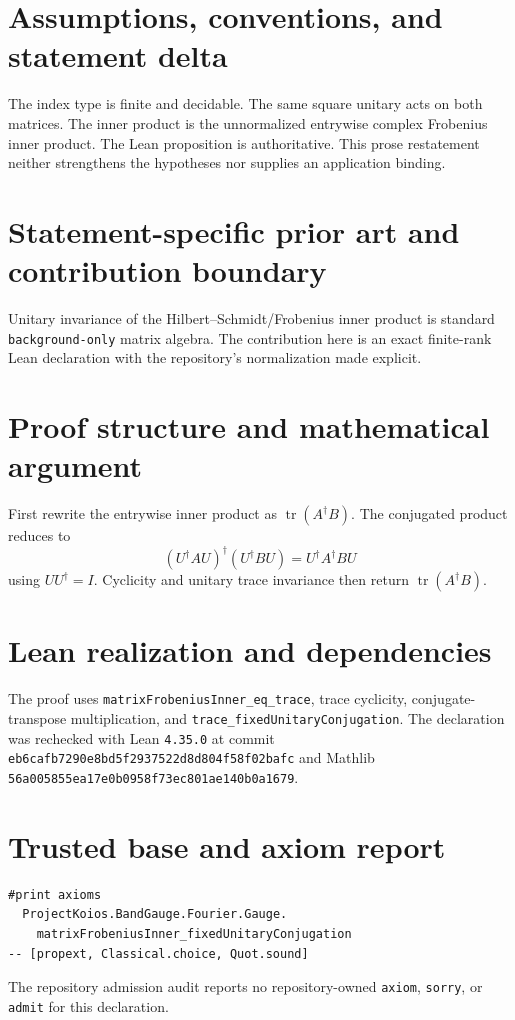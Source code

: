 \documentclass[11pt]{article}
\begin{document}
\section{Assumptions, conventions, and statement delta}
The index type is finite and decidable.  The same square unitary acts on both matrices.  The inner product is the unnormalized entrywise complex Frobenius inner product.
The Lean proposition is authoritative.  This prose restatement neither strengthens the hypotheses
nor supplies an application binding.

\section{Statement-specific prior art and contribution boundary}
Unitary invariance of the Hilbert--Schmidt/Frobenius inner product is standard \texttt{background-only} matrix algebra.  The contribution here is an exact finite-rank Lean declaration with the repository's normalization made explicit.

\section{Proof structure and mathematical argument}
First rewrite the entrywise inner product as $\operatorname{tr}(A^{\dagger}B)$.  The conjugated product reduces to
\[
 (U^{\dagger}AU)^{\dagger}(U^{\dagger}BU)=U^{\dagger}A^{\dagger}BU
\]
using $UU^{\dagger}=I$.  Cyclicity and unitary trace invariance then return $\operatorname{tr}(A^{\dagger}B)$.

\section{Lean realization and dependencies}
The proof uses \texttt{matrixFrobeniusInner\_eq\_trace}, trace cyclicity, conjugate-transpose multiplication, and \texttt{trace\_fixedUnitaryConjugation}.  The declaration was rechecked with Lean \texttt{4.35.0} at commit \texttt{eb6cafb7290e8bd5f2937522d8d804f58f02bafc} and Mathlib \texttt{56a005855ea17e0b0958f73ec801ae140b0a1679}.

\section{Trusted base and axiom report}
\begin{verbatim}
#print axioms
  ProjectKoios.BandGauge.Fourier.Gauge.
    matrixFrobeniusInner_fixedUnitaryConjugation
-- [propext, Classical.choice, Quot.sound]
\end{verbatim}
The repository admission audit reports no repository-owned \texttt{axiom}, \texttt{sorry}, or
\texttt{admit} for this declaration.
\end{document}
